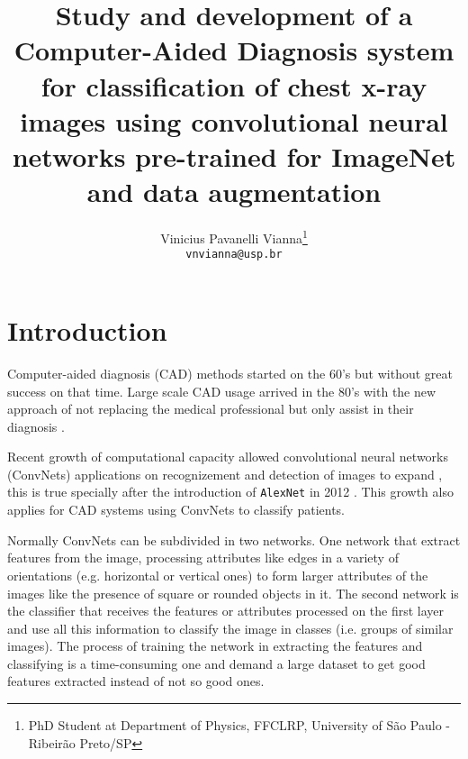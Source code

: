 \documentclass[twocolumn]{article}
\title{Study and development of a Computer-Aided Diagnosis system for classification of chest x-ray images using convolutional neural networks pre-trained for ImageNet and data augmentation}
\author{Vinicius Pavanelli Vianna\thanks{PhD Student at Department of Physics, FFCLRP, University of São Paulo - Ribeirão Preto/SP}\\
\texttt{vnvianna@usp.br}}
\newcommand{\mycite}{\cite}
\begin{document}
{}
\saythanks
\section{Introduction}
Computer-aided diagnosis (CAD) methods started on the 60's\mycite{CAD_1960} but without great success on that time. Large scale CAD usage arrived in the 80's with the new approach of not replacing the medical professional but only assist in their diagnosis \mycite{CAD_review}. 

Recent growth of computational capacity allowed convolutional neural networks (ConvNets) applications on recognizement and detection of images to expand \mycite{Lecun_2015}, this is true specially after the introduction of \texttt{AlexNet} in 2012 \mycite{ImageNet}. This growth also applies for CAD systems using ConvNets to classify patients.

Normally ConvNets can be subdivided in two networks. One network that extract features from the image, processing attributes like edges in a variety of orientations (e.g. horizontal or vertical ones) to form larger attributes of the images like the presence of square or rounded objects in it. The second network is the classifier that receives the features or attributes processed on the first layer and use all this information to classify the image in classes (i.e. groups of similar images). The process of training the network in extracting the features and classifying is a time-consuming one and demand a large dataset to get good features extracted instead of not so good ones.
\end{document}
